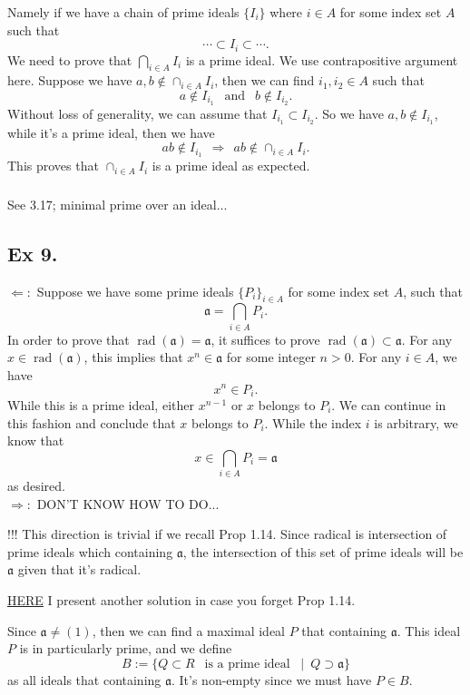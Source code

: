 Namely if we have a chain of prime ideals $\{I_i\}$ where $i\in A$ for some index set $A$ such that 
$$\cdots\subset I_i\subset \cdots.$$ We need to prove that $\bigcap _{i\in A} I_i$ is a prime ideal. 
We use contrapositive argument here. Suppose we have $a,b\notin \cap _{i\in A}I_i$, then we can find $i_1,i_2\in A$ such that 
$$a\notin I_{i_1}~~\text{ and }~~ b\notin I_{i_2}.$$
Without loss of generality, we can assume that $I_{i_1}\subset I_{i_2}$. So we have $a,b\notin I_{i_1}$, while it's a prime ideal, then we have 
$$ab\notin I_{i_1} ~~ \Rightarrow ~~ ab\notin \cap _{i\in A}I_i.$$
This proves that $\cap _{i\in A} I_i$ is a prime ideal as expected.

\subsubsection{}

See \cite{altman} 3.17; minimal prime over an ideal...

\subsection{Ex 9.}

$\Leftarrow:$ Suppose we have some prime ideals $\{P_i\}_{i\in A}$ for some index set $A$, such that 
$$\mathfrak a=\bigcap _{i\in A} P_i.$$
In order to prove that $\operatorname{rad}(\mathfrak a)=\mathfrak a$, it suffices to prove $\operatorname{rad}(\mathfrak a)\subset \mathfrak a$.
For any $x\in \operatorname{rad}(\mathfrak a)$, this implies that $x^n\in\mathfrak a$ for some integer $n>0$. For any $i\in A$, we have 
$$x^n\in P_i.$$
While this is a prime ideal, either $x^{n-1}$ or $x$ belongs to $P_i$. We can continue in this fashion and conclude that $x$ belongs to $P_i$. While the index $i$ is arbitrary, we know that $$x\in \bigcap _{i\in A}P_i=\mathfrak a$$ as desired.\\

\noindent$\Rightarrow:$ DON'T KNOW HOW TO DO... 

!!! This direction is trivial if we recall Prop 1.14. Since radical is intersection of prime ideals which containing $\mathfrak a$, the intersection of this set of prime ideals will be $\mathfrak a$ given that it's radical.


\href{https://math.stackexchange.com/questions/49309/intersection-of-prime-ideals}{HERE} I present another solution in case you forget Prop 1.14.

Since $\mathfrak a\neq (1)$, then we can find a maximal ideal $P$ that containing $\mathfrak a$. This ideal $P$ is in particularly prime, and we define 
$$B:=\{Q\subset R ~~\text{ is a prime ideal }~\mid~ Q\supset \mathfrak a\}$$
as all ideals that containing $\mathfrak a$. It's non-empty since we must have $P\in B$. 

